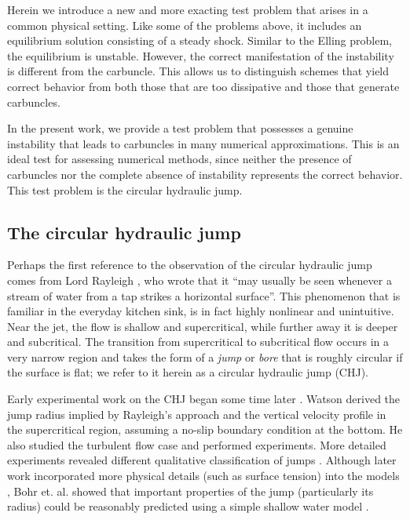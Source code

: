\documentclass[preprint, 11pt]{article}
\begin{document}
Herein we introduce a new and more exacting test problem that arises in a
common physical setting.  Like some
of the problems above, it includes an equilibrium solution consisting of a
steady shock.  Similar to the Elling problem, the equilibrium is unstable.
However, the correct manifestation of the instability is different from
the carbuncle.  This allows us to distinguish schemes that yield correct
behavior from both those that are too dissipative and those that generate
carbuncles.

In the present work, we provide a test problem that possesses a genuine instability
that leads to carbuncles in many numerical approximations.  This is an ideal
test for assessing numerical methods, since neither the presence of carbuncles
nor the complete absence of instability represents the correct behavior.
This test problem is the circular hydraulic jump.


\subsection{The circular hydraulic jump}

Perhaps the first reference to the observation of the circular hydraulic jump
comes from Lord Rayleigh \cite{rayleigh1914theory}, who wrote that it
``may usually be seen whenever a stream of water from a tap strikes a horizontal
surface''.  This phenomenon that is familiar in the everyday kitchen sink, is in
fact highly nonlinear and unintuitive.  Near the jet, the flow is shallow and
supercritical, while further away it is deeper and subcritical.  The transition from supercritical
to subcritical flow
occurs in a very narrow region and takes the form of a \emph{jump} or \emph{bore}
that is roughly circular if the surface is flat; we refer to it herein as a
circular hydraulic jump (CHJ).

Early experimental work on the CHJ began some time later
\cite{kurihara1946hydraulic,tani1949water,watson1964radial}.
Watson \cite{watson1964radial} derived the jump radius
implied by Rayleigh's approach and the vertical
velocity profile in the supercritical region, assuming a no-slip
boundary condition at the bottom.  He also studied the turbulent
flow case and performed experiments.
More detailed experiments revealed different qualitative classification
of jumps  \cite{ishigai1977heat,craik1981circular}.
Although later work incorporated more physical details (such as surface tension) into the models
\cite{bush2003influence}, Bohr et. al. showed that important properties of the jump
(particularly its radius) could be reasonably predicted using a simple shallow water
model \cite{bohr1993shallow}.
\end{document}
